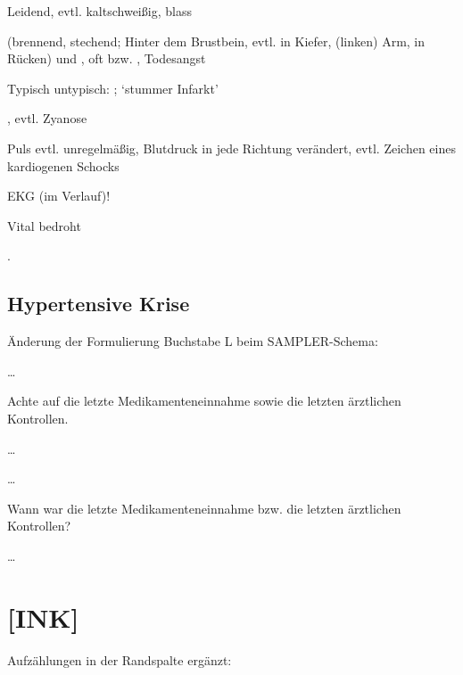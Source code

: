 \documentclass[
ngerman,
paper=a4,
asymmetric,
fontsize=10pt,
draft=false,
numbers=noenddot,
bibtotocnumbered,
footnotes=multiple,
]{scrreprt}
\newcommand{\jALT}{\vspace{6pt}\noindent{\color{red}\sffamily\textbf{DELETED}\hrulefill\newline}}
\newcommand{\jALTende}{\newline{\color{red}\rule{\linewidth}{2pt}\newline}}
\newcommand{\jNEU}{\vspace{6pt}\noindent{\color{green}\sffamily\textbf{ADDED}\hrulefill\newline}}
\newcommand{\jNEUende}{\newline{\color{green}\rule{\linewidth}{3pt}\newline}}
\begin{document}
 {
 \begin{ABCDESlide}
  \item[\ABCDE{3}]  Leidend, 
  evtl. kaltschweißig, blass
  \item[\ABCDE{4}]  (brennend, stechend;
  Hinter dem Brustbein, evtl.
    in Kiefer, (linken) Arm, in Rücken)
  und
  , oft  bzw.
  , Todesangst
  
 

  Typisch untypisch:
  ;  
  \enquote*{{stummer
  Infarkt}}  
  \item[\ABCDE{B}] , evtl. Zyanose
  \item[\ABCDE{C}] Puls evtl. unregelmäßig,   
  Blutdruck in jede Richtung
  verändert, evtl. Zeichen eines {kardiogenen Schocks}
  
  \item[\ABCDE{E}] EKG (im Verlauf)! 
  \item[\ABCDE{=}]  Vital bedroht
 \end{ABCDESlide}
 }
 {}
 {}
 {}
  .
  \jNEUende
  
\subsection{Hypertensive Krise}
Änderung der Formulierung Buchstabe L beim SAMPLER-Schema:

\jALT
\ldots
\begin{SAMPLERText}
  \item[\SAMPLER{L}] Achte auf die letzte
  Medikamenteneinnahme sowie die letzten ärztlichen
  Kontrollen.
\end{SAMPLERText}
\ldots
\jALTende

\jNEU
\ldots
\begin{SAMPLERText}
   \item[\SAMPLER{L}] Wann war die letzte
  Medikamenteneinnahme bzw. die letzten ärztlichen
  Kontrollen? 
\end{SAMPLERText}
\ldots
\jNEUende


\section{[INK]}
Aufzählungen in der Randspalte ergänzt:
\end{document}
